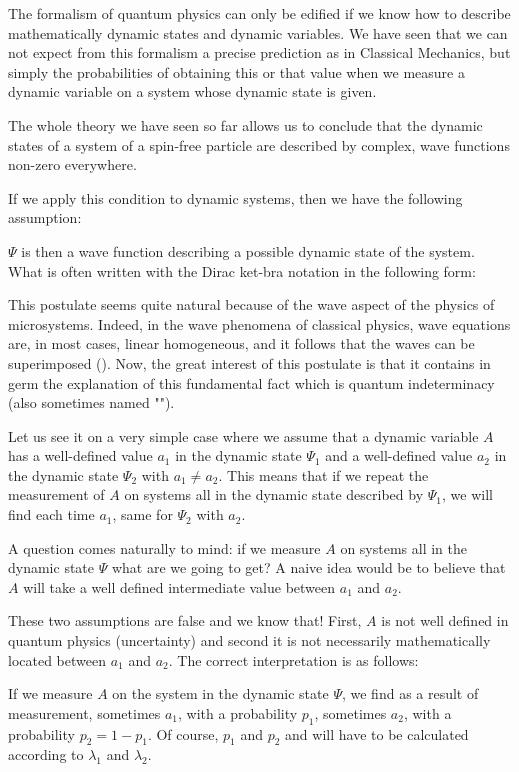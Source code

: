 	The formalism of quantum physics can only be edified if we know how to describe mathematically dynamic states and dynamic variables. We have seen that we can not expect from this formalism a precise prediction as in Classical Mechanics, but simply the probabilities of obtaining this or that value when we measure a dynamic variable on a system whose dynamic state is given.
	
	The whole theory we have seen so far allows us to conclude that the dynamic states of a system of a spin-free particle are described by complex, wave functions non-zero everywhere.

	If we apply this condition to dynamic systems, then we have the following assumption:
	
	$\Psi$ is then a wave function describing a possible dynamic state of the system. What is often written  with the Dirac ket-bra notation in the following form:
	
	This postulate seems quite natural because of the wave aspect of the physics of microsystems. Indeed, in the wave phenomena of classical physics, wave equations are, in most cases, linear homogeneous, and it follows that the waves can be superimposed (). Now, the great interest of this postulate is that it contains in germ the explanation of this fundamental fact which is quantum indeterminacy (also sometimes named "").
	
	Let us see it on a very simple case where we assume that a dynamic variable $A$ has a well-defined value $a_1$ in the dynamic state $\Psi_1$ and a well-defined value $a_2$ in the dynamic state $\Psi_2$ with $a_1\neq a_2$. This means that if we repeat the measurement of $A$ on systems all in the dynamic state described by $\Psi_1$, we will find each time $a_1$, same for $\Psi_2$ with $a_2$.
	
	A question comes naturally to mind: if we measure $A$ on systems all in the dynamic state $\Psi$ what are we going to get? A naive idea would be to believe that $A$ will take a well defined intermediate value between $a_1$ and $a_2$.

	These two assumptions are false and we know that! First, $A$ is not well defined in quantum physics (uncertainty) and second it is not necessarily mathematically located between $a_1$ and $a_2$. The correct interpretation is as follows:
	
	If we measure $A$ on the system in the dynamic state $\Psi$, we find as a result of measurement, sometimes $a_1$, with a probability $p_1$, sometimes $a_2$, with a probability $p_2=1-p_1$. Of course, $p_1$ and $p_2$ and will have to be calculated according to $\lambda_1$ and $\lambda_2$.
	
